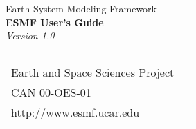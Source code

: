 \documentclass[]{article}
\begin{document}

\begin{titlepage}

\begin{center}
{\Large Earth System Modeling Framework } \\
\vspace{.25in}
{\Large {\bf ESMF User's Guide}} \\
\vspace{.25in}
{\large {\it Version 1.0}}
\vspace{.5in}
\end{center}

\begin{latexonly}
\vspace{6.0in}
\begin{tabular}{p{5in}p{.9in}}
\hrulefill \\
\noindent {\bf NASA High Performance Computing and Communications Program} \\
\noindent Earth and Space Sciences Project \\
\noindent CAN 00-OES-01 \\
\noindent http://www.esmf.ucar.edu \\
\end{tabular}
\end{latexonly}

\end{titlepage}

\tableofcontents

\newpage

\setlength{\parskip}{2ex}
\setlength{\parindent}{0ex}





\newpage









\end{document}
